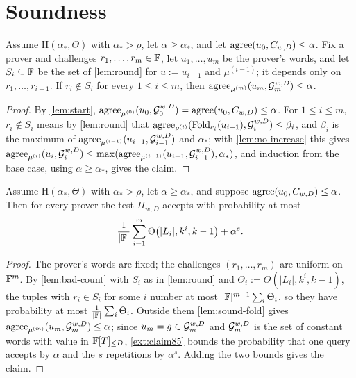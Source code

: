 \section{Soundness}

\begin{lemma}\label{lem:sound-fold}
Assume $\mathrm H(\alpha_*,\Theta)$ with $\alpha_*>\rho$, let $\alpha\ge\alpha_*$, and let
$\mathrm{agree}(u_0,C_{w,D})\le\alpha$. Fix a prover and challenges $r_1,\dots,r_m\in\mathbb{F}$, let
$u_1,\dots,u_m$ be the prover's words, and let $S_i\subseteq\mathbb{F}$ be the set of \cref{lem:round}
for $u:=u_{i-1}$ and $\mu^{(i-1)}$; it depends only on $r_1,\dots,r_{i-1}$. If $r_i\notin S_i$
for every $1\le i\le m$, then $\mathrm{agree}_{\mu^{(m)}}(u_m,\mathcal{G}_m^{w,D})\le\alpha$.
\end{lemma}

\begin{proof}
By \cref{lem:start}, $\mathrm{agree}_{\mu^{(0)}}(u_0,\mathcal{G}_0^{w,D})=\mathrm{agree}(u_0,C_{w,D})\le\alpha$. For
$1\le i\le m$, $r_i\notin S_i$ means by \cref{lem:round} that
$\mathrm{agree}_{\nu^{(i)}}(\mathrm{Fold}_{c_i}(u_{i-1}),\mathcal{G}_i^{w,D})\le\beta_i$, and $\beta_i$ is the maximum of
$\mathrm{agree}_{\mu^{(i-1)}}(u_{i-1},\mathcal{G}_{i-1}^{w,D})$ and $\alpha_*$; with \cref{lem:no-increase} this
gives
$\mathrm{agree}_{\mu^{(i)}}(u_i,\mathcal{G}_i^{w,D})\le\max(\mathrm{agree}_{\mu^{(i-1)}}(u_{i-1},\mathcal{G}_{i-1}^{w,D}),\alpha_*)$,
and induction from the base case, using $\alpha\ge\alpha_*$, gives the claim.
\end{proof}

\begin{theorem}\label{thm:reduction}
Assume $\mathrm H(\alpha_*,\Theta)$ with $\alpha_*>\rho$, let $\alpha\ge\alpha_*$, and suppose
$\mathrm{agree}(u_0,C_{w,D})\le\alpha$. Then for every prover the test $\Pi_{w,D}$ accepts with
probability at most
\[
\frac1{|\mathbb{F}|}\sum_{i=1}^{m}\Theta\big(|L_i|,k^i,k-1\big)+\alpha^s .
\]
\end{theorem}

\begin{proof}
The prover's words are fixed; the challenges $(r_1,\dots,r_m)$ are uniform on $\mathbb{F}^m$. By
\cref{lem:bad-count} with $S_i$ as in \cref{lem:round} and $\Theta_i:=\Theta(|L_i|,k^i,k-1)$, the
tuples with $r_i\in S_i$ for some $i$ number at most $|\mathbb{F}|^{m-1}\sum_i\Theta_i$, so they have
probability at most $\frac1{|\mathbb{F}|}\sum_i\Theta_i$. Outside them \cref{lem:sound-fold} gives
$\mathrm{agree}_{\mu^{(m)}}(u_m,\mathcal{G}_m^{w,D})\le\alpha$; since $u_m=g\in\mathcal{G}_m^{w,D}$ and $\mathcal{G}_m^{w,D}$ is the
set of constant words with value in $\mathbb{F}[T]_{\le D}$, \cref{ext:claim85} bounds the probability that
one query accepts by $\alpha$ and the $s$ repetitions by $\alpha^s$. Adding the two bounds gives the
claim.
\end{proof}

